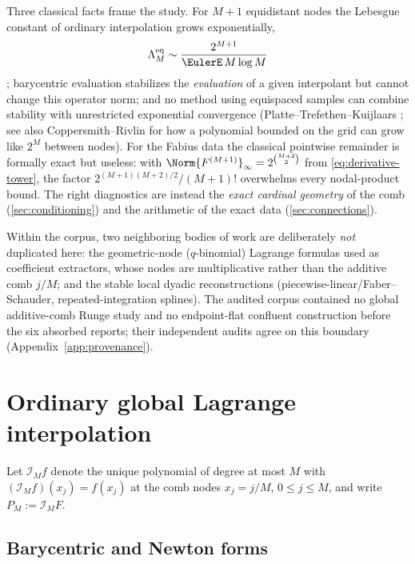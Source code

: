 \documentclass[11pt,oneside]{article}
\numberwithin{equation}{section}
\theoremstyle{definition}
\theoremstyle{remark}
\newcommand{\Lag}{\mathcal I}
\begin{document}
Three classical facts frame the study.  For $M+1$ equidistant nodes
the Lebesgue constant of ordinary interpolation grows exponentially,
\begin{equation}
 \Lambda^{\mathrm{eq}}_M
 \sim\frac{2^{M+1}}{\EulerE\,M\log M}
 \label{eq:classical-lebesgue}
\end{equation}
\cite{Mills1992,Brutman1997,Smith2006}; barycentric evaluation
\cite{BerrutTrefethen2004,Higham2004} stabilizes the \emph{evaluation}
of a given interpolant but cannot change this operator norm; and no
method using equispaced samples can combine stability with
unrestricted exponential convergence (Platte--Trefethen--Kuijlaars
\cite{PlatteTrefethenKuijlaars2011}; see also Coppersmith--Rivlin
\cite{CoppersmithRivlin1992} for how a polynomial bounded on the grid
can grow like $2^{M}$ between nodes).  For the Fabius data the
classical pointwise remainder is formally exact but useless: with
$\Norm{F^{(M+1)}}_\infty=2^{\binom{M+2}2}$ from
\eqref{eq:derivative-tower}, the factor
$2^{(M+1)(M+2)/2}/(M+1)!$ overwhelms every nodal-product bound.  The
right diagnostics are instead the \emph{exact cardinal geometry} of
the comb (\cref{sec:conditioning}) and the arithmetic of the exact
data (\cref{sec:connections}).

Within the corpus, two neighboring bodies of work are deliberately
\emph{not} duplicated here: the geometric-node ($q$-binomial) Lagrange
formulas used as coefficient extractors, whose nodes are
multiplicative rather than the additive comb $j/M$; and the stable
local dyadic reconstructions (piecewise-linear/Faber--Schauder,
repeated-integration splines).  The audited corpus contained no global
additive-comb Runge study and no endpoint-flat confluent construction
before the six absorbed reports; their independent audits agree on
this boundary (Appendix~\ref{app:provenance}).

\section{Ordinary global Lagrange interpolation}
\label{sec:ordinary}

Let $\Lag_M f$ denote the unique polynomial of degree at most $M$
with $(\Lag_Mf)(x_j)=f(x_j)$ at the comb nodes $x_j=j/M$,
$0\le j\le M$, and write $P_M:=\Lag_MF$.

\subsection{Barycentric and Newton forms}
\end{document}
